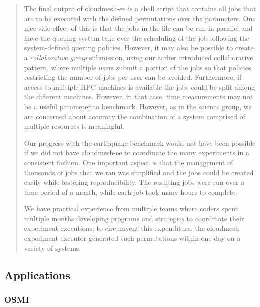 \documentclass[utf8]{FrontiersinVancouver} %
\begin{document}
\begin{quote}
The final output of cloudmesh-ee is a shell script that contains all jobs that are to be executed with the defined permutations over the parameters. One nice side effect of this is that the jobs in the file can be run in parallel and have the queuing system take over the scheduling of the job following the system-defined queuing policies. However, it may also be possible to create a {\it collaborative group} submission, using our earlier introduced collaborative pattern, where multiple users submit a portion of the jobs so that policies restricting the number of jobs per user can be avoided. Furthermore, if access to multiple HPC machines is available the jobs could be split among the different machines. However, in that case, time measurements may not be a useful parameter to benchmark. However, as in the science group, we are concerned about accuracy the combination of a system comprised of multiple resources is meaningful.

Our progress with the earthquake benchmark would not have been possible if we did not have cloudmesh-ee to coordinate the many experiments in a consistent fashion. One important aspect is that the management of thousands of jobs that we ran was simplified and the jobs could be created easily while fostering reproducibility. The resulting jobs were run over a time period of a month, while each job took many hours to complete.

We have practical experience from multiple teams where coders spent multiple months developing programs and strategies to coordinate their experiment executions; to circumvent this expenditure, the cloudmesh experiment executor generated such permutations within one day on a variety of systems.

\end{quote}

\subsection{Applications}


\subsubsection{OSMI}
\end{document}
